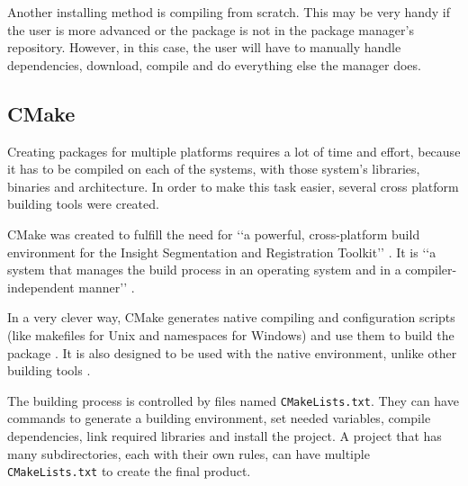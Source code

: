 Another installing method is compiling from scratch. This may be very handy if the user is more advanced or the package is not in the package manager's repository. However, in this case, the user will have to manually handle dependencies, download, compile and do everything else the manager does.

\subsection{CMake}
\label {sec:cmake}

Creating packages for multiple platforms requires a lot of time and effort, because it has to be compiled on each of the systems, with those system's libraries, binaries and architecture. In order to make this task easier, several cross platform building tools were created.

CMake was created to fulfill the need for \lq\lq a powerful, cross-platform build environment for the Insight Segmentation and Registration Toolkit\rq\rq{} \cite{cmake2017overview}. It is \lq\lq a system that manages the build process in an operating system and in a compiler-independent manner\rq\rq{} \cite{cmake2017overview}.

In a very clever way, CMake generates native compiling and configuration scripts (like makefiles for Unix and namespaces for Windows) and use them to build the package \cite{cmake2017overview}. It is also designed to be used with the native environment, unlike other building tools \cite{cmake2017overview}.

The building process is controlled by files named \texttt{CMakeLists.txt}. They can have commands to generate a building environment, set needed variables, compile dependencies, link required libraries and install the project. A project that has many subdirectories, each with their own rules, can have multiple \texttt{CMakeLists.txt} to create the final product.
